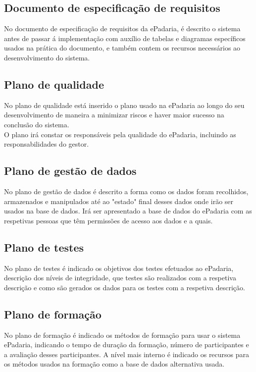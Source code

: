 \subsection{Documento de especificação de requisitos}
No documento de especificação de requisitos da ePadaria, é descrito o sistema antes de passar á implementação com auxílio de tabelas e diagramas específicos usados na prática do documento, e também contem os recursos necessários ao desenvolvimento do sistema. 

\subsection{Plano de qualidade}
No plano de qualidade está inserido o plano usado na ePadaria ao longo do seu desenvolvimento de maneira a minimizar riscos e haver maior sucesso na conclusão do sistema. \\ O plano irá constar os responsáveis pela qualidade do ePadaria, incluindo as responsabilidades do gestor.

\subsection{Plano de gestão de dados}
No plano de gestão de dados é descrito a forma como os dados foram recolhidos, armazenados e manipulados até ao "estado" final desses dados onde irão ser usados na base de dados. Irá ser apresentado a base de dados do ePadaria com as respetivas pessoas que têm permissões de acesso aos dados e a quais.

\subsection{Plano de testes}
No plano de testes é indicado os objetivos dos testes efetuados ao ePadaria, descrição dos níveis de integridade, que testes são realizados com a respetiva descrição e como são gerados os dados para os testes com a respetiva descrição.

\subsection{Plano de formação}
No plano de formação é indicado os métodos de formação para usar o sistema ePadaria, indicando o tempo de duração da formação, número de participantes e a avaliação desses participantes. A nível mais interno é indicado os recursos para os métodos usados na formação como a base de dados alternativa usada.

